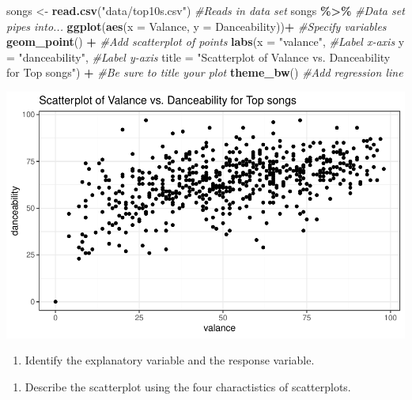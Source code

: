 \documentclass[
]{report}
\newenvironment{Shaded}{\begin{snugshade}}{\end{snugshade}}
\newcommand{\AttributeTok}[1]{\textcolor[rgb]{0.13,0.29,0.53}{#1}}
\newcommand{\CommentTok}[1]{\textcolor[rgb]{0.56,0.35,0.01}{\textit{#1}}}
\newcommand{\FunctionTok}[1]{\textcolor[rgb]{0.13,0.29,0.53}{\textbf{#1}}}
\newcommand{\NormalTok}[1]{#1}
\newcommand{\OtherTok}[1]{\textcolor[rgb]{0.56,0.35,0.01}{#1}}
\newcommand{\SpecialCharTok}[1]{\textcolor[rgb]{0.81,0.36,0.00}{\textbf{#1}}}
\newcommand{\StringTok}[1]{\textcolor[rgb]{0.31,0.60,0.02}{#1}}
\providecommand{\tightlist}{%
  \setlength{\itemsep}{0pt}\setlength{\parskip}{0pt}}
\begin{document}
\begin{Shaded}
\begin{Highlighting}[]
\NormalTok{songs }\OtherTok{\textless{}{-}} \FunctionTok{read.csv}\NormalTok{(}\StringTok{"data/top10s.csv"}\NormalTok{) }\CommentTok{\#Reads in data set}
\NormalTok{songs }\SpecialCharTok{\%\textgreater{}\%} \CommentTok{\#Data set pipes into...}
\FunctionTok{ggplot}\NormalTok{(}\FunctionTok{aes}\NormalTok{(}\AttributeTok{x =}\NormalTok{ Valance, }\AttributeTok{y =}\NormalTok{ Danceability))}\SpecialCharTok{+}  \CommentTok{\#Specify variables}
  \FunctionTok{geom\_point}\NormalTok{() }\SpecialCharTok{+}  \CommentTok{\#Add scatterplot of points}
  \FunctionTok{labs}\NormalTok{(}\AttributeTok{x =} \StringTok{"valance"}\NormalTok{,  }\CommentTok{\#Label x{-}axis}
       \AttributeTok{y =} \StringTok{"danceability"}\NormalTok{,  }\CommentTok{\#Label y{-}axis}
       \AttributeTok{title =} \StringTok{"Scatterplot of Valance vs. Danceability for Top songs"}\NormalTok{) }\SpecialCharTok{+} \CommentTok{\#Be sure to title your plot}
  \FunctionTok{theme\_bw}\NormalTok{()  }\CommentTok{\#Add regression line}
\end{Highlighting}
\end{Shaded}

\begin{center}\includegraphics[width=0.7\linewidth]{14-UR-module13_review_files/figure-latex/unnamed-chunk-1-1} \end{center}

\begin{enumerate}
\def\labelenumi{\arabic{enumi}.}
\tightlist
\item
  Identify the explanatory variable and the response variable.
\end{enumerate}

\vspace{0.3in}

\begin{enumerate}
\def\labelenumi{\arabic{enumi}.}
\setcounter{enumi}{1}
\tightlist
\item
  Describe the scatterplot using the four charactistics of scatterplots.
\end{enumerate}
\end{document}

